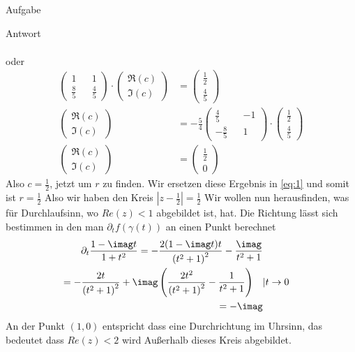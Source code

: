 \documentclass{scrartcl}
\let\*\cdot
\begin{document}
\begin{section}{Aufgabe}
\begin{subsection}{Antwort}
\begin{itemize}
\begin{align*}
\end{align*}
oder
\begin{align*}
    \begin{pmatrix}
    1&&1\\\frac{8}{5}&&\frac{4}{5}
\end{pmatrix}\*\begin{pmatrix}
    \Re(c)\\\Im(c)
\end{pmatrix}&=\begin{pmatrix}
    \frac{1}{2}\\\frac{4}{5}
\end{pmatrix}\\
  \begin{pmatrix}
    \Re(c)\\\Im(c)
\end{pmatrix}&=-\frac{5}{4}\begin{pmatrix}
    \frac{4}{5}&&-1\\
    -\frac{8}{5}&&1
\end{pmatrix}\*\begin{pmatrix}
    \frac{1}{2}\\\frac{4}{5}
\end{pmatrix}\\
\begin{pmatrix}
    \Re(c)\\\Im(c)
\end{pmatrix}&=\begin{pmatrix}
    \frac{1}{2}\\0
\end{pmatrix}
\end{align*}
Also $c=\frac{1}{2}$, jetzt um $r$ zu finden. Wir ersetzen diese Ergebnis in \eqref{eq:1} und somit ist $r=\frac{1}{2}$
Also wir haben den Kreis $\left|z-\frac{1}{2}\right|=\frac{1}{2}$
Wir wollen nun herausfinden, was für Durchlaufsinn, wo $Re(z)<1$ abgebildet ist, hat. Die Richtung lässt sich bestimmen in den man $\partial_t f(\gamma(t))$ an einen Punkt berechnet
\begin{align*}
        \partial_t \frac{1-\imag t}{1+t^2}
=-\frac{2 (1-\imag t) t}{\left(t^2+1\right)^2}-\frac{\imag}{t^2+1}\\
=-\frac{2 t}{\left(t^2+1\right)^2}+\imag \left(\frac{2
   t^2}{\left(t^2+1\right)^2}-\frac{1}{t^2+1}\right)\quad &|t\rightarrow 0\\
   =-\imag
\end{align*}
An der Punkt $(1,0)$ entspricht dass eine Durchrichtung im Uhrsinn, das bedeutet dass $Re(z)<2$ wird Außerhalb dieses Kreis abgebildet.\\

\end{itemize}
\end{subsection}
\end{section}
\end{document}
